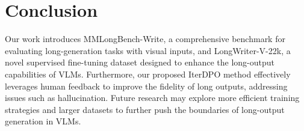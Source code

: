\section{Conclusion}

Our work introduces MMLongBench-Write, a comprehensive benchmark for evaluating long-generation tasks with visual inputs, and LongWriter-V-22k, a novel supervised fine-tuning dataset designed to enhance the long-output capabilities of VLMs. Furthermore, our proposed IterDPO method effectively leverages human feedback to improve the fidelity of long outputs, addressing issues such as hallucination. Future research may explore more efficient training strategies and larger datasets to further push the boundaries of long-output generation in VLMs.